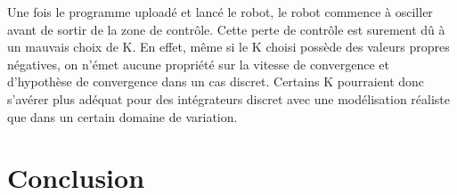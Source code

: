 \documentclass[11pt]{article}
\begin{document}
Une fois le programme uploadé et lancé le robot, le robot commence à osciller avant de sortir de la zone de contrôle. Cette perte de contrôle est surement dû à un mauvais choix de K. En effet, même si le K choisi possède des valeurs propres négatives, on n'émet aucune propriété sur la vitesse de convergence et d'hypothèse de convergence dans un cas discret. Certains K pourraient donc s'avérer plus adéquat pour des intégrateurs discret avec une modélisation réaliste que dans un certain domaine de variation.

\section*{Conclusion}
\end{document}
